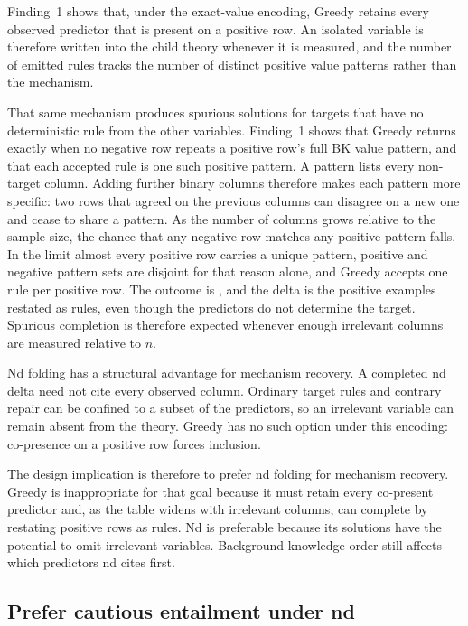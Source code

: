 \documentclass[11pt]{article}
\DeclareRobustCommand{\code}[1]{\texttt{\detokenize{#1}}}
\begin{document}
Finding~1 shows that, under the exact-value encoding, Greedy retains every
observed predictor that is present on a positive row. An isolated variable is
therefore written into the child theory whenever it is measured, and the number
of emitted rules tracks the number of distinct positive value patterns rather
than the mechanism.

That same mechanism produces spurious solutions for targets that have no
deterministic rule from the other variables. Finding~1 shows that Greedy
returns \code{solved} exactly when no negative row repeats a positive row's
full BK value pattern, and that each accepted rule is one such positive
pattern. A pattern lists every non-target column. Adding further binary
columns therefore makes each pattern more specific: two rows that agreed on
the previous columns can disagree on a new one and cease to share a pattern.
As the number of columns grows relative to the sample size, the chance that
any negative row matches any positive pattern falls. In the limit almost every
positive row carries a unique pattern, positive and negative pattern sets are
disjoint for that reason alone, and Greedy accepts one rule per positive row.
The outcome is \code{solved}, and the delta is the positive examples restated
as rules, even though the predictors do not determine the target. Spurious
completion is therefore expected whenever enough irrelevant columns are
measured relative to \(n\).

Nd folding has a structural advantage for mechanism recovery. A completed nd
delta need not cite every observed column. Ordinary target rules and contrary
repair can be confined to a subset of the predictors, so an irrelevant variable
can remain absent from the theory. Greedy has no such option under this
encoding: co-presence on a positive row forces inclusion.

The design implication is therefore to prefer nd folding for mechanism recovery.
Greedy is inappropriate for that goal because it must
retain every co-present predictor and, as the table widens with irrelevant
columns, can complete by restating positive rows as rules. Nd is preferable
because its solutions have the potential to omit irrelevant variables.
Background-knowledge order still affects which predictors nd cites first.

\subsection{Prefer cautious entailment under nd}
\end{document}
